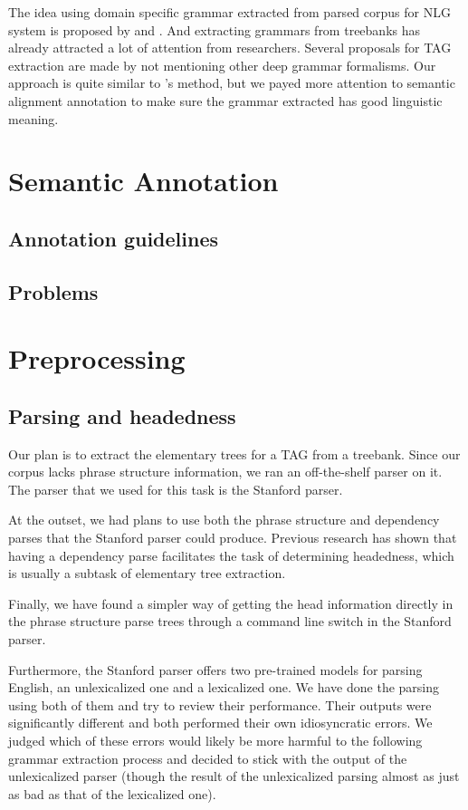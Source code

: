\documentclass[a4paper]{article}
\begin{document}
The idea using domain specific grammar extracted from parsed corpus for NLG system is proposed by \citet{DeVault2008a} and \citet{DeVault2008}. And extracting grammars from treebanks has already attracted a lot of attention from researchers. Several proposals for TAG extraction are made by \citet{Xia2001,Xia1999,Xia2006,Chen} not mentioning other deep grammar formalisms. Our approach is quite similar to \citet{DeVault2008a}'s method, but we payed more attention to semantic alignment annotation to make sure the grammar extracted has good linguistic meaning.
\section{Semantic Annotation}
\label{sec:sem-annot}
\subsection{Annotation guidelines}
\subsection{Problems}


\section{Preprocessing}

\subsection{Parsing and headedness}

Our plan is to extract the elementary trees for a TAG from a treebank.
Since our corpus lacks phrase structure information, we ran an
off-the-shelf parser on it. The parser that we used for this task is
the Stanford parser.

At the outset, we had plans to use both the phrase structure and
dependency parses that the Stanford parser could produce. Previous
research has shown that having a dependency parse facilitates the task
of determining headedness, which is usually a subtask of elementary
tree extraction.

Finally, we have found a simpler way of getting the head information
directly in the phrase structure parse trees through a command line
switch in the Stanford parser.


Furthermore, the Stanford parser offers two pre-trained models for
parsing English, an unlexicalized one and a lexicalized one. We have
done the parsing using both of them and try to review their
performance. Their outputs were significantly different and both
performed their own idiosyncratic errors. We judged which of these
errors would likely be more harmful to the following grammar
extraction process and decided to stick with the output of the
unlexicalized parser (though the result of the unlexicalized parsing
almost as just as bad as that of the lexicalized one).
\end{document}
